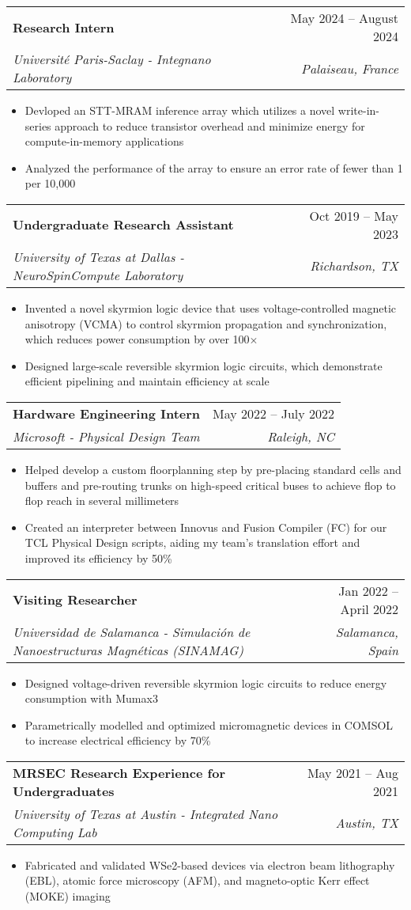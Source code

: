 \documentclass[letterpaper,11pt]{article}
\makeatletter
\newcommand{\resumeItem}[1]{
  \item\small{
    {#1 \vspace{-2pt}}
  }
}
\newcommand{\resumeSubheading}[4]{
  \vspace{-2pt}\item
    \begin{tabular*}{0.97\textwidth}[t]{l@{\extracolsep{\fill}}r}
      \textbf{#1} & #2 \\
      \textit{\small#3} & \textit{\small #4} \\
    \end{tabular*}\vspace{-7pt}
}
\newcommand{\resumeItemListStart}{\begin{itemize}}
\newcommand{\resumeItemListEnd}{\end{itemize}\vspace{-5pt}}
\makeatother
\begin{document}
      \resumeSubheading
      {Research Intern}{May 2024 -- August 2024}
      {Université Paris-Saclay - Integnano Laboratory}{Palaiseau, France}
      \resumeItemListStart
        \resumeItem{Devloped an STT-MRAM inference array which utilizes a novel write-in-series approach to reduce transistor overhead and minimize energy for compute-in-memory applications}
        \resumeItem{Analyzed the performance of the array to ensure an error rate of fewer than 1 per 10,000}
      \resumeItemListEnd

      \resumeSubheading
      {Undergraduate Research Assistant}{Oct 2019 -- May 2023}
      {University of Texas at Dallas - NeuroSpinCompute Laboratory}{Richardson, TX}
      \resumeItemListStart
        \resumeItem{Invented a novel skyrmion logic device that uses voltage-controlled magnetic anisotropy (VCMA) to control skyrmion propagation and synchronization, which reduces power consumption by over 100$\times$}
        \resumeItem{Designed large-scale reversible skyrmion logic circuits, which demonstrate efficient pipelining and maintain efficiency at scale}
      \resumeItemListEnd

      \resumeSubheading
      {Hardware Engineering Intern}{May 2022 -- July 2022}
      {Microsoft - Physical Design Team}{Raleigh, NC}
      \resumeItemListStart
        \resumeItem{Helped develop a custom floorplanning step by pre-placing standard cells and buffers and pre-routing trunks on high-speed critical buses to achieve flop to flop reach in several millimeters}
        \resumeItem{Created an interpreter between Innovus and Fusion Compiler (FC) for our TCL Physical Design scripts, aiding my team's translation effort and improved its efficiency by 50\%}
      \resumeItemListEnd
      
      \resumeSubheading
      {Visiting Researcher}{Jan 2022 -- April 2022}
      {Universidad de Salamanca - Simulación de Nanoestructuras Magnéticas (SINAMAG)}{Salamanca, Spain}
      \resumeItemListStart
        \resumeItem{Designed voltage-driven reversible skyrmion logic circuits to reduce energy consumption with Mumax3}
        \resumeItem{Parametrically modelled and optimized micromagnetic devices in COMSOL to increase electrical efficiency by 70\%}
      \resumeItemListEnd
      
      \resumeSubheading
      {MRSEC Research Experience for Undergraduates}{May 2021 -- Aug 2021}
      {University of Texas at Austin - Integrated Nano Computing Lab}{Austin, TX}
      \resumeItemListStart
        \resumeItem{Fabricated and validated WSe2-based devices via electron beam lithography (EBL), atomic force microscopy (AFM), and magneto-optic Kerr effect (MOKE) imaging}
      \resumeItemListEnd
\end{document}
